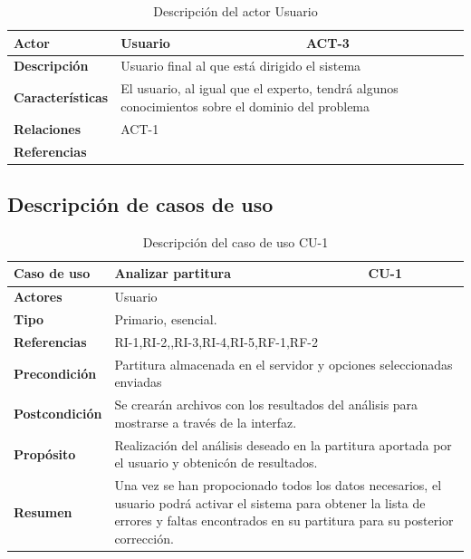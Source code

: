 \begin{table}[H]
	\begin{tabular}{@{}|l|p{9cm}|p{2cm}|@{}}
		\hline
		\textbf{Actor} & Usuario & \cellcolor{gray}ACT-3 \\ \hline
		\textbf{Descripción} & \multicolumn{2}{p{11cm}|}{Usuario final al que está dirigido el sistema} \\ \hline
		\textbf{Características} & \multicolumn{2}{p{11cm}|}{El usuario, al igual que el experto, tendrá algunos conocimientos sobre el dominio del problema} \\ \hline
		\textbf{Relaciones} & \multicolumn{2}{p{11cm}|}{ACT-1} \\ \hline
		\textbf{Referencias} & \multicolumn{2}{p{11cm}|}{} \\ \hline
	\end{tabular}
	\caption{Descripción del actor Usuario}
	\label{tablaACT3}
\end{table}

\subsection{Descripción de casos de uso}

\begin{table}[H]
	\begin{tabular}{@{}|l|p{9cm}|p{2cm}|@{}}
		\hline
		\textbf{Caso de uso} & Analizar partitura & \cellcolor{gray}CU-1 \\ \hline
		\textbf{Actores} & \multicolumn{2}{p{11cm}|}{Usuario} \\ \hline 
		\textbf{Tipo} & \multicolumn{2}{p{11cm}|}{Primario, esencial.} \\ \hline
		\textbf{Referencias} & \multicolumn{2}{p{11cm}|}{RI-1,RI-2,,RI-3,RI-4,RI-5,RF-1,RF-2} \\ \hline
		\textbf{Precondición} & \multicolumn{2}{p{11cm}|}{Partitura almacenada en el servidor y opciones seleccionadas enviadas} \\ \hline
		\textbf{Postcondición} & \multicolumn{2}{p{11cm}|}{Se crearán archivos con los resultados del análisis para mostrarse a través de la interfaz.} \\ \hline
		\textbf{Propósito} & \multicolumn{2}{p{11cm}|}{Realización del análisis deseado en la partitura aportada por el usuario y obtenicón de resultados.} \\ \hline
		\textbf{Resumen} & \multicolumn{2}{p{11cm}|}{Una vez se han propocionado todos los datos necesarios, el usuario podrá activar el sistema para obtener la lista de errores y faltas encontrados en su partitura para su posterior corrección.} \\ \hline
	\end{tabular}
	\caption{Descripción del caso de uso CU-1}
	\label{CU-1}
\end{table}

